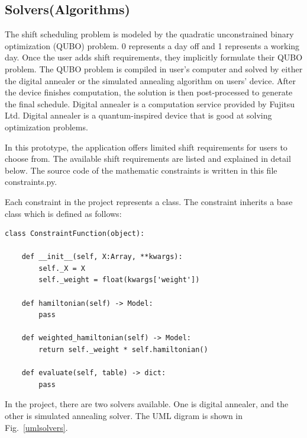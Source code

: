 \documentclass[11pt, oneside]{article}   	%
\begin{document}
\subsection{Solvers(Algorithms)}
The shift scheduling problem is modeled by the quadratic unconstrained binary optimization (QUBO) problem. 0 represents a day off and 1 represents a working day. Once the user adds shift requirements, they implicitly formulate their QUBO problem. The QUBO problem is compiled in user's computer and solved by either the digital annealer or the simulated annealing algorithm on users' device. After the device finishes computation, the solution is then post-processed to generate the final schedule. Digital annealer is a computation service provided by Fujitsu Ltd. Digital annealer is a quantum-inspired device that is good at solving optimization problems.

In this prototype, the application offers limited shift requirements for users to choose from. The available shift requirements are listed and explained in detail below. The source code of the mathematic constraints is written in this file constraints.py.

Each constraint in the project represents a class. The constraint inherits a base class which is defined as follows:
\begin{verbatim}
class ConstraintFunction(object):
    
    def __init__(self, X:Array, **kwargs):
        self._X = X
        self._weight = float(kwargs['weight'])
        
    def hamiltonian(self) -> Model:
        pass

    def weighted_hamiltonian(self) -> Model:
        return self._weight * self.hamiltonian()
    
    def evaluate(self, table) -> dict:
        pass
\end{verbatim}

In the project, there are two solvers available. One is digital annealer, and the other is simulated annealing solver. The UML digram is shown in Fig.~\ref{umlsolvers}.
\end{document}
